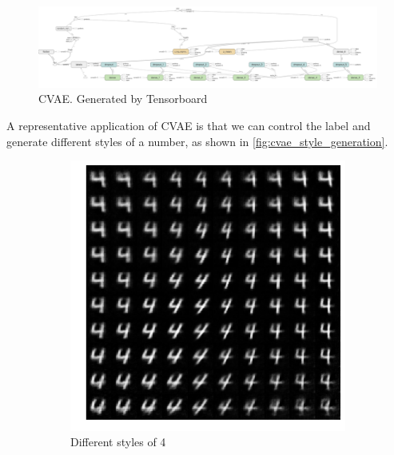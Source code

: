 \documentclass[a4paper,10pt,UTF8]{article}
\numberwithin{equation}{section}
\numberwithin{figure}{section}
\begin{document}
\begin{figure}[htbp]
\centering
\includegraphics[width=1.0\textwidth]{img/cvae_structure.png}
\caption{CVAE. Generated by Tensorboard}
\label{fig:cvae_structure}
\end{figure}

A representative application of CVAE is that we can control the label and generate different styles of a number, as shown in \autoref{fig:cvae_style_generation}.

\begin{figure}[htbp]
    \centering
    \begin{subfigure}[h]{0.49\linewidth}
        \centering
        \includegraphics[width=1.0\textwidth]{img/cvae_4.png}
        \caption{Different styles of 4}
    \end{subfigure}
    \begin{subfigure}[h]{0.49\linewidth}
        \centering

\end{subfigure}
\end{figure}
\end{document}
